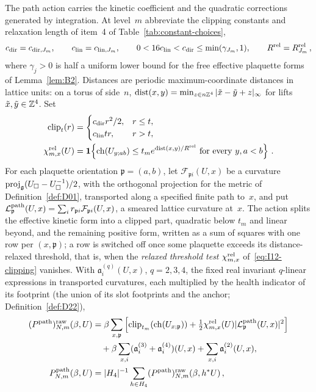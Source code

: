 The path action carries the kinetic coefficient and the quadratic corrections generated by integration. At level~$m$ abbreviate the clipping constants and relaxation length of item~4 of Table~\ref{tab:constant-choices},
\begin{equation*}
c_{\rm dir}=c_{{\rm dir},J_m},\qquad c_{\rm lin}=c_{{\rm lin},J_m},\qquad 0<16c_{\rm lin}<c_{\rm dir}\le\min(\gamma_{J_m},1),\qquad R^{\rm rel}=R_{J_m}^{\rm rel}\,,
\end{equation*}
where $\gamma_j>0$ is half a uniform lower bound for the free effective plaquette forms of Lemma~\ref{lem:B2}. Distances are periodic maximum-coordinate distances in lattice units: on a torus of side~$n$, $\operatorname{dist}(x,y)=\min_{z\in n\mathbb{Z}^4}|\tilde x-\tilde y+z|_\infty$ for lifts $\tilde x,\tilde y\in\mathbb{Z}^4$. Set
\begin{align}\label{eq:I12-clipping}
\operatorname{clip}_{t}(r)&=
\begin{cases}c_{\rm dir}r^2/2,&r\le t,\\c_{\rm lin}tr,&r>t,\end{cases}\notag\\
\chi^{\rm rel}_{m,x}(U)&=\mathbf1\!\left\{
\operatorname{ch}(U_{y;ab})\le t_m e^{\operatorname{dist}(x,y)/R^{\rm rel}}
\text{ for every }y,a<b\right\}\,.
\end{align}
For each plaquette orientation $\mathfrak p=(a,b)$, let $\mathcal F_{\mathfrak p i}(U,x)$ be a curvature $\operatorname{proj}_{\mathfrak{g}}(U_\square-U_\square^{-1})/2$, with the orthogonal projection for the metric of Definition~\ref{def:D01}, transported along a specified finite path to~$x$, and put $\mathcal L_{\mathfrak p}^{\rm path}(U,x)=\sum_i r_{\mathfrak p i}\mathcal F_{\mathfrak p i}(U,x)$, a smeared lattice curvature at~$x$. The action splits the effective kinetic form into a clipped part, quadratic below $t_m$ and linear beyond, and the remaining positive form, written as a sum of squares with one row per $(x,\mathfrak p)$; a row is switched off once some plaquette exceeds its distance-relaxed threshold, that is, when the \emph{relaxed threshold test} $\chi^{\rm rel}_{m,x}$ of~\eqref{eq:I12-clipping} vanishes. With $\mathfrak a_i^{(q)}(U,x)$, $q=2,3,4$, the fixed real invariant $q$-linear expressions in transported curvatures, each multiplied by the health indicator of its footprint (the union of its slot footprints and the anchor; Definition~\ref{def:D22}),
\begin{align}\label{eq:I12-path-action}
(P^{\mathrm{path}})^{\rm raw}_{N,m}(\beta,U)
&=\beta\sum_{x,\mathfrak p}\left[
\operatorname{clip}_{t_m}(\operatorname{ch}(U_{x;\mathfrak p}))
+\tfrac12\chi^{\rm rel}_{m,x}(U)|\mathcal L_{\mathfrak p}^{\rm path}(U,x)|^2\right]\notag\\
&\quad+\beta\sum_{x,i}(\mathfrak a_i^{(3)}+\mathfrak a_i^{(4)})(U,x)
+\sum_{x,i}\mathfrak a_i^{(2)}(U,x),\\
P^{\mathrm{path}}_{N,m}(\beta,U)
&=|H_4|^{-1}\sum_{h\in H_4}(P^{\mathrm{path}})^{\rm raw}_{N,m}(\beta,h^*U)\,,\notag
\end{align}

